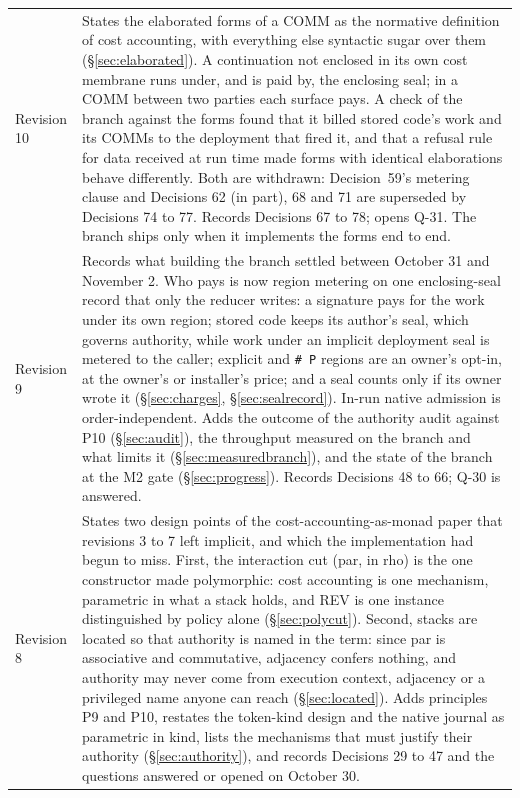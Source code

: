 \documentclass[11pt]{article}
\begin{document}
\begin{center}
\begin{tabular}{@{}lP{10.6cm}@{}}
Revision 10 & States the elaborated forms of a COMM as the normative definition of cost accounting, with everything else syntactic sugar over them (\S\ref{sec:elaborated}). A continuation not enclosed in its own cost membrane runs under, and is paid by, the enclosing seal; in a COMM between two parties each surface pays. A check of the branch against the forms found that it billed stored code's work and its COMMs to the deployment that fired it, and that a refusal rule for data received at run time made forms with identical elaborations behave differently. Both are withdrawn: Decision~59's metering clause and Decisions 62 (in part), 68 and 71 are superseded by Decisions 74 to 77. Records Decisions 67 to 78; opens Q-31. The branch ships only when it implements the forms end to end. \\
Revision 9 & Records what building the branch settled between October 31 and November 2. Who pays is now region metering on one enclosing-seal record that only the reducer writes: a signature pays for the work under its own region; stored code keeps its author's seal, which governs authority, while work under an implicit deployment seal is metered to the caller; explicit and \texttt{\# P} regions are an owner's opt-in, at the owner's or installer's price; and a seal counts only if its owner wrote it (\S\ref{sec:charges}, \S\ref{sec:sealrecord}). In-run native admission is order-independent. Adds the outcome of the authority audit against P10 (\S\ref{sec:audit}), the throughput measured on the branch and what limits it (\S\ref{sec:measuredbranch}), and the state of the branch at the M2 gate (\S\ref{sec:progress}). Records Decisions 48 to 66; Q-30 is answered. \\
Revision 8 & States two design points of the cost-accounting-as-monad paper that revisions 3 to 7 left implicit, and which the implementation had begun to miss. First, the interaction cut (par, in rho) is the one constructor made polymorphic: cost accounting is one mechanism, parametric in what a stack holds, and REV is one instance distinguished by policy alone (\S\ref{sec:polycut}). Second, stacks are located so that authority is named in the term: since par is associative and commutative, adjacency confers nothing, and authority may never come from execution context, adjacency or a privileged name anyone can reach (\S\ref{sec:located}). Adds principles P9 and P10, restates the token-kind design and the native journal as parametric in kind, lists the mechanisms that must justify their authority (\S\ref{sec:authority}), and records Decisions 29 to 47 and the questions answered or opened on October 30. \\

\end{tabular}
\end{center}
\end{document}
